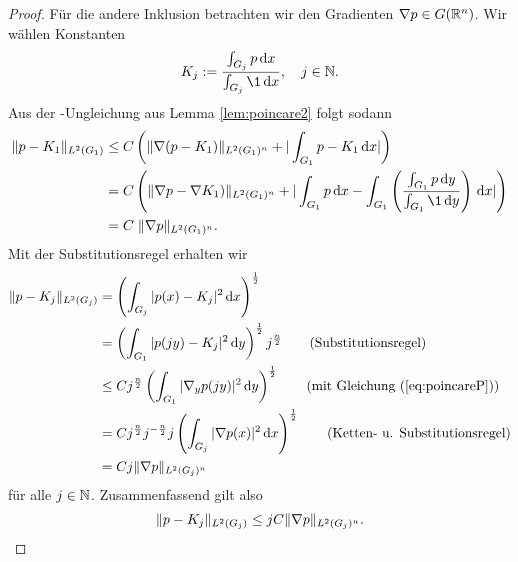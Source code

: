 \begin{proof}
  Für die andere Inklusion betrachten wir den Gradienten $\nabla p \in G(\mathbb{R}^n)$.
  Wir wählen Konstanten 
  $$
  K_j := \frac{\int_{G_j} p \d x}{\int_{G_j} \1 \d x}, \quad j \in \N.
  $$
  Aus der \poincare\hyp{}Ungleichung aus Lemma \ref{lem:poincare2} folgt sodann
  \begin{align}
  \norm{p - K_1}_{L^2(G_1)} 
  &\leq C \left(\norm{\nabla (p - K_1)}_{L^2(G_1)^n} + | \int_{G_1} p - K_1 \d x |\right) \nonumber\\
  &= C \left(\norm{\nabla p - \nabla K_1)}_{L^2(G_1)^n} + | \int_{G_1} p \d x  - \int_{G_1} \left(\frac{\int_{G_1} p \d y}{\int_{G_1} \1 \d y} \right) \d x |\right) \nonumber\\
    \label{eq:poincareP}
  &=  C \;\norm{\nabla p}_{L^2(G_1)^n}.
\end{align}
  Mit der Substitutionsregel erhalten wir
\begin{align*}
  \norm{p - K_j}_{L^2(G_j)} 
  &= \left( \int_{G_j} |p(x) - K_j|^2 \d x \right)^\frac{1}{2} \\
  &= \left( \int_{G_1} |p(jy) - K_j|^2 \d y \right)^\frac{1}{2} j^\frac{n}{2} \tag{Substitutionsregel}\\
  &\leq C j^{\frac{n}{2}}\left( \int_{G_1} |\nabla_y p(jy) |^2 \d y \right)^{\frac{1}{2}} \tag{mit Gleichung (\ref{eq:poincareP})}\\
  &= C j^{\frac{n}{2}}j^{-\frac{n}{2}}j \left( \int_{G_j} |\nabla p(x) |^2 \d x \right)^{\frac{1}{2}} \tag{Ketten- u. Substitutionsregel} \\
  &= C j \norm{\nabla p}_{L^2(G_j)^n}
\end{align*}
  für alle $j \in \mathbb{N}$.
  Zusammenfassend gilt also
  \begin{equation}
    \label{eq:gradientInequality}
    \lVert p - K_j \rVert_{L^2(G_j)} \leq j C\lVert \nabla p \rVert_{L^2(G_j)^n}.
  \end{equation}


\end{proof}
